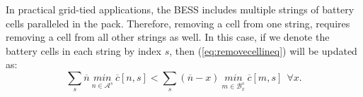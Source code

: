 \documentclass[10pt,twocolumn]{IEEEtran}
\begin{document}
In practical grid-tied applications,  the BESS  includes multiple strings of battery cells paralleled in the pack.
Therefore,  removing a cell from one string, requires  removing a cell from all other strings as well.
In this case, if we denote the battery cells in each string by index $s$,  then (\ref{eq:removecellineq}) will be updated  as:
%
\begin{equation}
\sum_{s} \overline{n} \  \underset{n\in \mathcal{A}^s}{min} \ \overline c[n,s] <  \sum_{s}(\overline{n}-x) \ \underset{m\in \mathcal{B}^{s}_x}{min} \ \overline c[m,s] \ \  \forall x.
\label{eq:removecellineq2}
\end{equation}
%
%
%
%
\end{document}
